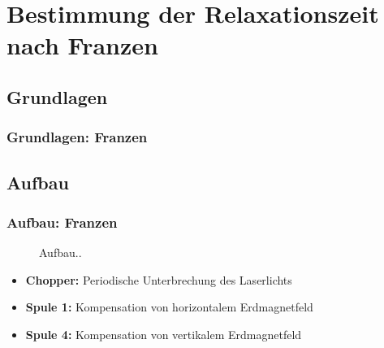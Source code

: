 
\section{Bestimmung der Relaxationszeit nach Franzen}
\subsection{Grundlagen}
\begin{frame}
\frametitle{Grundlagen: Franzen}
  
\end{frame}

\subsection{Aufbau}
\begin{frame}
\frametitle{Aufbau: Franzen}

\begin{figure}
    \centering
    \def\svgwidth{\textwidth}
    
    \caption{Aufbau..}
\end{figure}

\begin{itemize}
  \item \textbf{Chopper:} Periodische Unterbrechung des Laserlichts
  \item \textbf{Spule 1:} Kompensation von horizontalem Erdmagnetfeld
  \item \textbf{Spule 4:} Kompensation von vertikalem Erdmagnetfeld
\end{itemize}

\end{frame}

